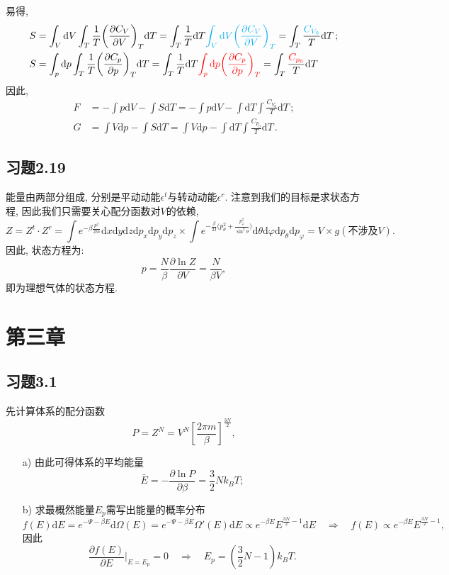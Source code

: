\documentclass[letterpaper, 10pt]{article}
\newcommand{\dd}{\mathrm{d}}
\begin{document}
\begin{itemize}
	易得, 
	\begin{align*}
	S & = \int_{V} \dd V \int_{T} \frac{1}{T} \bigg( \frac{\partial C_{V}}{\partial V} \bigg)_{T} \dd T = 
	\int_{T} \frac{1}{T} \dd T {\color{cyan}{\int_{V} \dd V \bigg( \frac{\partial C_{V}}{\partial V} \bigg)_{T}}} = \int_{T} \frac{{\color{cyan}{C_{V_{0}}}}}{T} \dd T \,; \\
	S & = \int_{p} \dd p \int_{T} \frac{1}{T} \bigg( \frac{\partial C_{p}}{\partial p} \bigg)_{T} \dd T = 
	\int_{T} \frac{1}{T} \dd T {\color{red}{\int_{p} \dd p \bigg( \frac{\partial C_{p}}{\partial p} \bigg)_{T}}} = \int_{T} \frac{{\color{red}{C_{p_{0}}}}}{T} \dd T \,
	\end{align*}
	因此,
	\begin{align*}
	F & = - \int p \dd V - \int S \dd T = - \int p \dd V - \int \dd T \int \frac{C_{V_{0}}}{T} \dd T \,; \\
	G & = \int V \dd p - \int S \dd T = \int V \dd p - \int \dd T \int \frac{C_{p_{0}}}{T} \dd T \,.
	\end{align*}
\end{itemize}

\subsection{习题2.19}
能量由两部分组成, 分别是平动动能$\epsilon^{t}$与转动动能$\epsilon^{r}$. 注意到我们的目标是求状态方程, 因此我们只需要关心配分函数对$V$的依赖,
\[ Z = Z^{t} \cdot Z^{r} = \int e^{-\beta \frac{p^2}{2m}} \dd x \dd y \dd z \dd p_{x} \dd p_{y} \dd p_{z} \times 
\int e^{- \frac{\beta}{2I} \big( p_{\theta}^2 + \frac{p_{\varphi}^2}{\sin^2\!\theta} \big)} \dd \theta \dd \varphi \dd p_{\theta} \dd p_{\varphi} = V \times g(\text{不涉及$V$}).
\]
因此, 状态方程为:
\[ p = \frac{N}{\beta} \frac{\partial \ln Z}{\partial V} = \frac{N}{\beta V}, \]
即为理想气体的状态方程.

\newpage
\section{第三章}

\subsection{习题3.1}
先计算体系的配分函数
\[ P = Z^{N} = V^{N} \left[ \frac{2\pi m}{\beta} \right]^{\frac{3N}{2}},  \]
\begin{itemize}
	\item[a)]
	由此可得体系的平均能量
	\[ \bar{E} = - \frac{\partial \ln P}{\partial \beta} = \frac{3}{2} Nk_{B}T; \]
	\item[b)]
	求最概然能量$E_{p}$需写出能量的概率分布
	\[ f(E)\dd E = e^{-\Psi - \beta E} \dd \Omega(E) = e^{-\Psi - \beta E} \Omega'(E) \dd E \propto e^{-\beta E} E^{\frac{3N}{2}-1} \dd E \quad{} 
	\Rightarrow \quad{} f(E) \propto e^{-\beta E} E^{\frac{3N}{2}-1}, \]
	因此
	\[ \frac{\partial f(E)}{\partial E} \bigg|_{E=E_{p}} = 0 \quad{} \Rightarrow \quad{} E_{p} = \left(\frac{3}{2}N - 1\right) k_{B}T. \]
\end{itemize}
\end{document}
